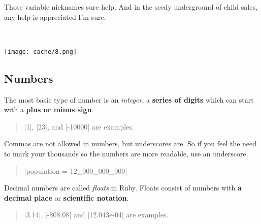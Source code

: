\documentclass[12pt,twoside]{report}
\begin{document}
Those variable nicknames sure help.  And in the seedy underground of
child sales, any help is appreciated I'm sure.

\ %

	\hspace{2.3cm}\texttt{[image: cache/8.png]}

\subsection{Numbers}


The most basic type of number is an {\em integer}, a {\bf series of
  digits} which can start with a {\bf plus or minus sign}.

\begin{quote}
\rubyinline|1|, \rubyinline|23|, and
\rubyinline|-10000| are examples.\end{quote}


Commas are not allowed in numbers, but underscores are.  So if you
feel the need to mark your thousands so the numbers are more readable,
use an underscore.

\begin{quote}
\rubyinline|population = 12_000_000_000|\end{quote}


Decimal numbers are called {\em floats} in Ruby.  Floats consist of
numbers with {\bf a decimal place} or {\bf scientific notation}.

\begin{quote}
\rubyinline|3.14|,
\rubyinline|-808.08| and
\rubyinline|12.043e-04| are examples.\end{quote}
\end{document}

